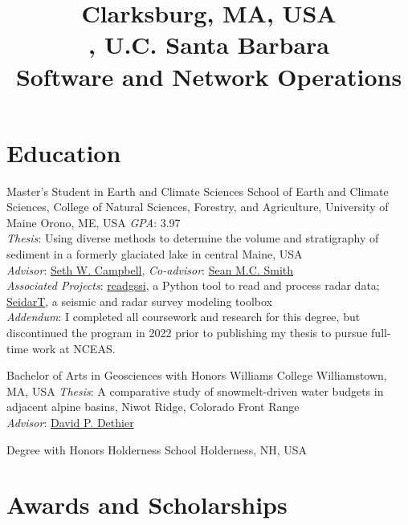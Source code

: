 \documentclass[a4paper,12pt,sans,colorlinks]{moderncv}
\title{%
    \small
    Clarksburg, MA, USA
    \\
    \nceas{}, U.C. Santa Barbara
    \\
    \dataonefed{} Software and Network Operations
}
\newcommand{\seth}{\href{https://www.alpinesciences.net}{Seth W. Campbell}}
\newcommand{\sean}{\href{https://umaine.edu/earthclimate/people/sean-m-c-smith/}{Sean M.C. Smith}}
\newcommand{\david}{\href{https://geosciences.williams.edu/profile/ddethier/}{David P. Dethier}}
\newcommand{\rsudp}{\href{https://github.com/iannesbitt/readgssi}{readgssi}}
\newcommand{\seidart}{\href{https://github.com/UMainedynamics/SeidarT}{SeidarT}}
\begin{document}

\maketitle
\vspace{-3em}


\section{Education}

{Master's Student in Earth and Climate Sciences}
{School of Earth and Climate Sciences,
College of Natural Sciences, Forestry, and Agriculture,
University of Maine}
{Orono, ME, USA}
{}
{
    \emph{GPA}: 3.97
    \\
    \emph{Thesis}: Using diverse methods to determine the volume and stratigraphy
    of sediment in a formerly glaciated lake in central Maine, USA
    \\
    \emph{Advisor}: \seth{}, \emph{Co-advisor}: \sean{}
    \\
    \emph{Associated Projects}: \rsudp{}, a Python tool to read and process radar data;
    \seidart{}, a seismic and radar survey modeling toolbox
    \\
    \emph{Addendum}: I completed all coursework and research for this degree, but discontinued the program in 2022 prior to publishing my thesis to pursue full-time work at NCEAS.
}

{Bachelor of Arts in Geosciences with Honors}
{Williams College}
{Williamstown, MA, USA}
{}
{
    \emph{Thesis}: A comparative study of snowmelt-driven water budgets in
    adjacent alpine basins, Niwot Ridge, Colorado Front Range
    \\
    \emph{Advisor}: \david{}
}

{Degree with Honors}
{Holderness School}
{Holderness, NH, USA}
{}
{}


\section{Awards and Scholarships}
\end{document}
